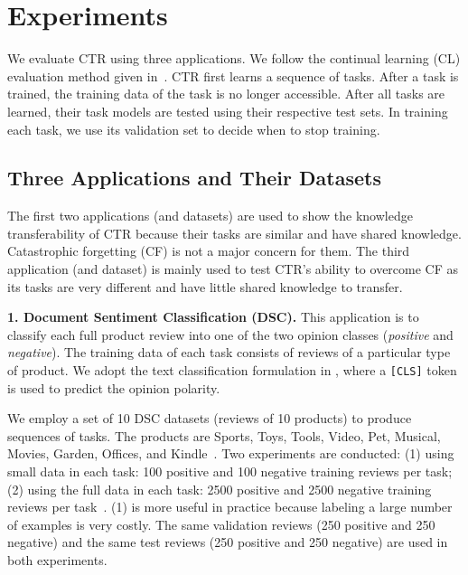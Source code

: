 \documentclass{article}
\begin{document}
\section{Experiments}
\label{Sectionexperiments}
We evaluate CTR using three applications. We follow the continual learning (CL) evaluation method given in~\cite{DBLP:journals/corr/abs-1909-08383}.
CTR first learns a sequence of tasks. After a task is trained, the training data of the task is no longer accessible. After all tasks are learned, their task models are tested using their respective test sets. In training each task, we use its validation set to decide when to stop training. 





\subsection{Three Applications and Their Datasets}

The first two applications (and datasets) are used to show the knowledge transferability of CTR because their tasks are similar and have shared knowledge. Catastrophic forgetting (CF) is not a major concern for them. The third application (and dataset) is mainly used to test CTR's ability to overcome CF as its tasks are very different and have little shared knowledge to transfer.  

\textbf{1. Document Sentiment Classification (DSC).} This application is to classify each full product review into one of the two opinion classes (\textit{positive} and \textit{negative}). The training data of each task consists of
reviews of a particular type of product. We adopt the text classification formulation in \cite{DBLP:conf/naacl/DevlinCLT19}, where a \texttt{[CLS]} token is used 
to predict the opinion polarity.


We employ a set of 10 DSC datasets (reviews of 10 products) to produce sequences of tasks. The products are Sports, Toys, Tools, Video, Pet, Musical, Movies, Garden, Offices, and Kindle~\cite{ke2020continual}. Two experiments are conducted: (1) using small data in each task: 100 positive and 100 negative training reviews per task; (2) using the full data in each task: 2500 positive and 2500 negative training reviews per task~\cite{ke2020continual}. (1) is more useful in practice because labeling a large number of examples is very costly. The same validation reviews (250 positive and 250 negative) and the same test reviews (250 positive and 250 negative) are used in both experiments. 
\end{document}
